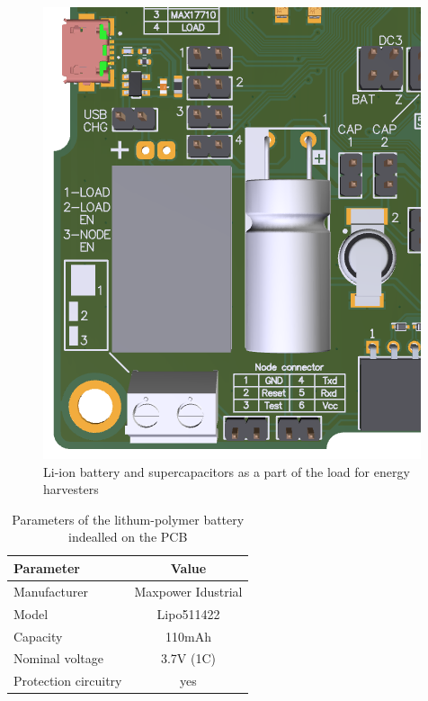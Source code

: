 \documentclass[12pt,a4paper]{article}
\begin{document}
\begin{figure}[ht!]
\includegraphics[scale=0.75]{batteryload.png}
\caption{Li-ion battery and supercapacitors as a part of the load for energy harvesters}
\label{fig:batteryload}
\end{figure} 

\begin{table}[ht!]
\begin{tabular}{|l|c|}
\hline
\textbf{Parameter}              & \textbf{Value} \\ \hline
Manufacturer & Maxpower Idustrial          \\ \hline
Model                 & Lipo511422        \\ \hline
Capacity                & 110mAh         \\ \hline
Nominal voltage     & 3.7V (1C)            \\ \hline
Protection circuitry     & yes           \\ \hline
\end{tabular}
\caption{Parameters of the lithum-polymer battery indealled on the PCB \cite{battery_params} }
\label{tab:battery}
\end{table}
\end{document}
